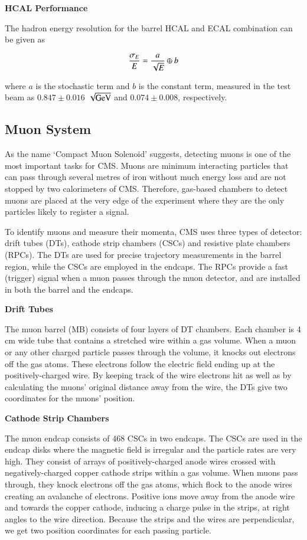 {\bf HCAL Performance}

The hadron energy resolution for the barrel HCAL and ECAL combination can be given as 

\begin{equation} \label{hcalresolution}
\it \frac{\sigma_{E}}{E} = \frac{a}{\sqrt{E}}  \oplus b 
\end{equation}

where $a$ is the stochastic term and $b$ is the constant term, measured in the test beam as $0.847\pm 0.016$ $\sqrt{\rm GeV}$ and $0.074 \pm 0.008$, respectively.


\subsection{Muon System}

As the name `Compact Muon Solenoid' suggests, detecting muons is one of the most important tasks for CMS. Muons are minimum interacting particles that can pass through several metres of iron   without much energy loss  and are not stopped by two calorimeters of CMS. Therefore, gas-based chambers to detect muons are placed at the very edge of the experiment where they are the only particles likely to register a signal. 

To identify muons and measure their momenta, CMS uses three types of detector: drift tubes (DTs), cathode strip chambers (CSCs) and resistive plate chambers (RPCs). The DTs are used for precise trajectory measurements in the barrel region, while the CSCs are employed in the endcaps. The RPCs provide a fast (trigger) signal when a muon passes through the muon detector, and are installed in both the barrel and the endcaps.

{\bf Drift Tubes}

The muon barrel (MB) consists of four layers of DT chambers. Each chamber is 4 cm wide tube that contains a stretched wire within a gas volume. When a muon or any other charged particle passes through the volume, it knocks out electrons off the gas atoms. These electrons follow the electric field ending up at the positively-charged wire. By keeping track of the wire electrons hit as well as by calculating the muons' original distance away from the wire, the DTs give two coordinates for the muons' position.

{\bf Cathode Strip Chambers}

The muon endcap consists of 468 CSCs in two endcaps. The CSCs are used in the endcap disks where the magnetic field is irregular and the particle rates are very high. They consist of arrays of positively-charged anode wires crossed with negatively-charged copper cathode strips within a gas volume. When muons pass through, they knock electrons off the gas atoms, which flock to the anode wires creating an avalanche of electrons. Positive ions move away from the anode wire and towards the copper cathode, inducing a charge pulse in the strips, at right angles to the wire direction. Because the strips and the wires are perpendicular, we get two position coordinates for each passing particle.

